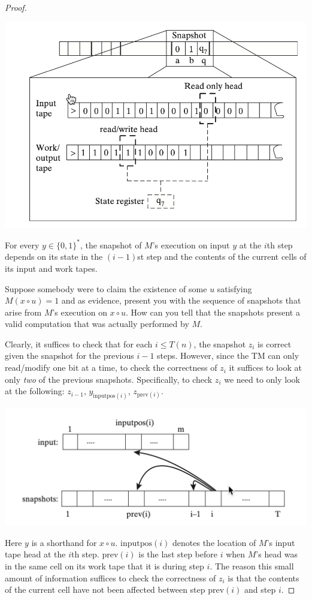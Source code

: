 \documentclass[11pt]{article}
\begin{document}
\begin{proof}
\begin{center}
\includegraphics[width=.5\textwidth]{./5.png}
\end{center}

For every \(y\in\{0,1\}^*\), the snapshot of \(M\)'s execution on input \(y\) at the \(i\)th
step depends on its state in the \((i-1)\)st step and the contents of the current cells of its
input and work tapes.

Suppose somebody were to claim the existence of some \(u\) satisfying \(M(x\circ u)=1\) and as
evidence, present you with the sequence of snapshots that arise from \(M\)'s execution
on \(x\circ u\). How can you tell that the snapshots present a valid computation that was
actually performed by \(M\).

Clearly, it suffices to check that for each \(i\le T(n)\), the snapshot \(z_i\) is correct
given the snapshot for the previous \(i-1\) steps. However, since the TM can only read/modify
one bit at a time, to check the correctness of \(z_i\) it suffices to look at only \emph{two} of the
previous snapshots. Specifically, to check \(z_i\) we need to only look at the following:
\(z_{i-1}\), \(y_{\text{inputpos}(i)}\), \(z_{\text{prev}(i)}\).

\begin{center}
\includegraphics[width=.8\textwidth]{./2.png}
\end{center}

Here \(y\) is a shorthand
for \(x\circ u\). \(\text{inputpos}(i)\) denotes the location of \(M\)'s input tape head at
the \(i\)th step. \(\text{prev}(i)\) is the last step before \(i\) when \(M\)'s head was in the
same cell on its work tape that it is during step \(i\). The reason this small amount of
information suffices to check the correctness of \(z_i\) is that the contents of the current
cell have not been affected between step \(\text{prev}(i)\) and step \(i\).


\end{proof}
\end{document}
